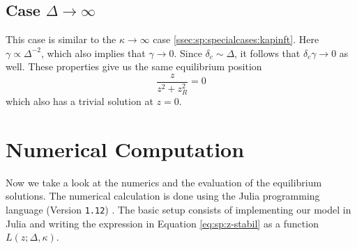 \subsection{Case \texorpdfstring{$\Delta \rightarrow \infty$}{detuning -> infinity}}

This case is similar to the $\kappa \rightarrow \infty$ case \ref{ssec:sp:specialcases:kapinft}.
Here $\gamma \propto \Delta^{-2}$, which also implies that $\gamma \rightarrow 0$.
Since $\delta_c \sim \Delta$,
    it follows that $\delta_c \gamma \rightarrow 0$ as well.
These properties give us the same equilibrium position
\begin{equation}
    \frac{z}{z^2+z_R^2} = 0
\end{equation}
which also has a trivial solution at $z = 0$.

\section{Numerical Computation}
\label{sec:sp:numerics}

Now we take a look at the numerics and the evaluation of the equilibrium solutions.
The numerical calculation is done using the Julia programming language (Version \texttt{1.12}) \cite{Julia-2017}.
The basic setup consists of implementing our model in Julia
    and writing the expression in Equation \eqref{eq:sp:z-stabil} as a function $L(z; \Delta, \kappa)$.

